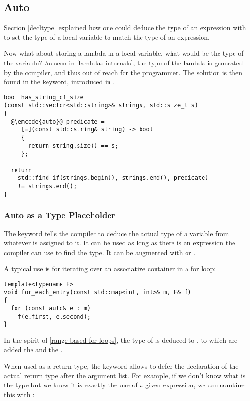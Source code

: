 \subsection{Auto}
\label{auto}

Section \ref{decltype} explained how one could deduce the type of an
expression with  to set the type of a local variable
to match the type of an expression.

Now what about storing a lambda in a local variable, what would be the
type of the variable? As seen in \ref{lambdas-internals}, the type of
the lambda is generated by the compiler, and thus out of reach for the
programmer. The solution is then found in the  keyword,
introduced in .

\begin{lstlisting}
bool has_string_of_size
(const std::vector<std::string>& strings, std::size_t s)
{
  @\emcode{auto}@ predicate =
     [=](const std::string& string) -> bool
     {
       return string.size() == s;
     };

  return
    std::find_if(strings.begin(), strings.end(), predicate)
    != strings.end();
}
\end{lstlisting}

\subsubsection{Auto as a Type Placeholder}

The  keyword tells the compiler to deduce the actual type
of a variable from whatever is assigned to it. It can be used as long
as there is an expression the compiler can use to find the type. It
can be augmented with  or \code{\&}.

A typical use is for iterating over an associative container in a for
loop:

\begin{lstlisting}
template<typename F>
void for_each_entry(const std::map<int, int>& m, F& f)
{
  for (const auto& e : m)
    f(e.first, e.second);
}
\end{lstlisting}

In the spirit of \ref{range-based-for-loops}, the type of  is
deduced to , to which are added the 
and the \code{\&}.

When used as a return type, the  keyword allows to defer
the declaration of the actual return type after the argument list. For
example, if we don't know what is the type but we know it is exactly
the one of a given expression, we can combine this with
:

